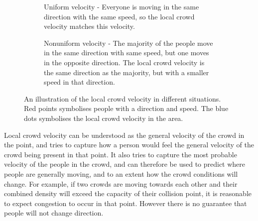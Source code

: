 \begin{figure}[htbp]
\centering
\begin{subfigure}[t]{0.48\linewidth}
\centering
{}
\caption{Uniform velocity - Everyone is moving in the same direction with the same speed, so the local crowd velocity matches this velocity.}
\end{subfigure}
\quad
\begin{subfigure}[t]{0.48\linewidth}
\centering
{}
\caption{Nonuniform velocity - The majority of the people move in the same direction with same speed, but one moves in the opposite direction. The local crowd velocity is the same direction as the majority, but with a smaller speed in that direction.}
\end{subfigure}
\caption[Local crowd velocity illustration]{An illustration of the local crowd velocity in different situations. Red points symbolises people with a direction and speed. The blue dots symbolises the local crowd velocity in the area.}
\label{fig:localCrowdVelocity}
\end{figure}

Local crowd velocity can be understood as the general velocity of the crowd in the point, and tries to capture how a person would feel the general velocity of the crowd being present in that point. It also tries to capture the most probable velocity of the people in the crowd, and can therefore be used to predict where people are generally moving, and to an extent how the crowd conditions will change. For example, if two crowds are moving towards each other and their combined density will exceed the capacity of their collision point, it is reasonable to expect congestion to occur in that point. However there is no guarantee that people will not change direction.

